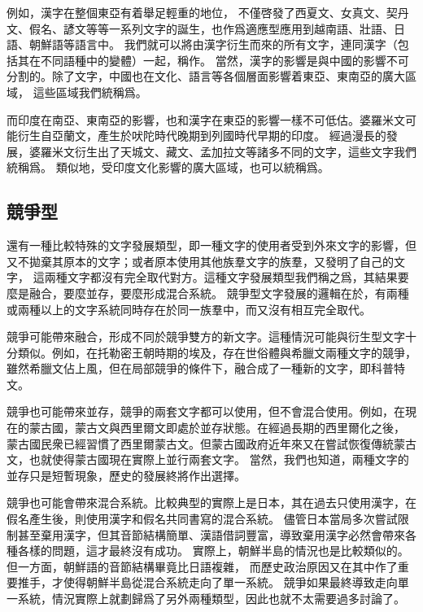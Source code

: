 例如，漢字在整個東亞有着舉足輕重的地位，
不僅啓發了西夏文、女真文、契丹文、假名、諺文等等一系列文字的誕生，也作爲適應型應用到越南語、壯語、日語、朝鮮語等語言中。
我們就可以將由漢字衍生而來的所有文字，連同漢字（包括其在不同語種中的變體）一起，稱作。
當然，漢字的影響是與中國的影響不可分割的。除了文字，中國也在文化、語言等各個層面影響着東亞、東南亞的廣大區域，
這些區域我們統稱爲。

而印度在南亞、東南亞的影響，也和漢字在東亞的影響一樣不可低估。婆羅米文可能衍生自亞蘭文，產生於吠陀時代晚期到列國時代早期的印度。
經過漫長的發展，婆羅米文衍生出了天城文、藏文、孟加拉文等諸多不同的文字，這些文字我們統稱爲。
類似地，受印度文化影響的廣大區域，也可以統稱爲。

\subsection{競爭型}
還有一種比較特殊的文字發展類型，即一種文字的使用者受到外來文字的影響，但又不拋棄其原本的文字；或者原本使用其他族羣文字的族羣，又發明了自己的文字，
這兩種文字都沒有完全取代對方。這種文字發展類型我們稱之爲，其結果要麼是融合，要麼並存，要麼形成混合系統。
競爭型文字發展的邏輯在於，有兩種或兩種以上的文字系統同時存在於同一族羣中，而又沒有相互完全取代。

競爭可能帶來融合，形成不同於競爭雙方的新文字。這種情況可能與衍生型文字十分類似。例如，在托勒密王朝時期的埃及，存在世俗體與希臘文兩種文字的競爭，
雖然希臘文佔上風，但在局部競爭的條件下，融合成了一種新的文字，即科普特文。

競爭也可能帶來並存，競爭的兩套文字都可以使用，但不會混合使用。例如，在現在的蒙古國，蒙古文與西里爾文即處於並存狀態。在經過長期的西里爾化之後，
蒙古國民衆已經習慣了西里爾蒙古文。但蒙古國政府近年來又在嘗試恢復傳統蒙古文，也就使得蒙古國現在實際上並行兩套文字。
當然，我們也知道，兩種文字的並存只是短暫現象，歷史的發展終將作出選擇。

競爭也可能會帶來混合系統。比較典型的實際上是日本，其在過去只使用漢字，在假名產生後，則使用漢字和假名共同書寫的混合系統。
儘管日本當局多次嘗試限制甚至棄用漢字，但其音節結構簡單、漢語借詞豐富，導致棄用漢字必然會帶來各種各樣的問題，這才最終沒有成功。
實際上，朝鮮半島的情況也是比較類似的。但一方面，朝鮮語的音節結構畢竟比日語複雜，
而歷史政治原因又在其中作了重要推手，才使得朝鮮半島從混合系統走向了單一系統。
競爭如果最終導致走向單一系統，情況實際上就劃歸爲了另外兩種類型，因此也就不太需要過多討論了。

